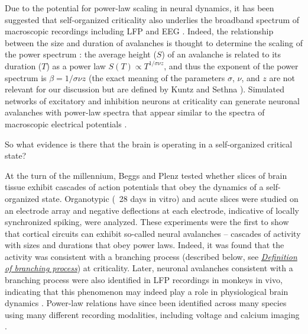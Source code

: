 Due to the potential for power-law scaling in neural dynamics, it has been suggested that self-organized criticality also underlies the broadband spectrum of macroscopic recordings including LFP and EEG \cite{Lombardi2017}. Indeed, the relationship between the size and duration of avalanches is thought to determine the scaling of the power spectrum \cite{Kuntz2000}: the average height ($S$) of an avalanche is related to its duration ($T$) as a power law $S(T)\propto T^{1/\sigma\nu z}$, and thus the exponent of the power spectrum is $\beta=1/\sigma\nu z$ (the exact meaning of the parameters $\sigma$, $\nu$, and $z$ are not relevant for our discussion but are defined by Kuntz and Sethna \cite{Kuntz2000}). Simulated networks of excitatory and inhibition neurons at criticality can generate neuronal avalanches with power-law spectra that appear similar to the spectra of macroscopic electrical potentials \cite{Lombardi2017}.

So what evidence is there that the brain is operating in a self-organized critical state?

At the turn of the millennium, Beggs and Plenz \cite{Beggs2003} tested whether slices of brain tissue exhibit cascades of action potentials that obey the dynamics of a self-organized state. Organotypic (~28 days in vitro) and acute slices were studied on an electrode array and negative deflections at each electrode, indicative of locally synchronized spiking, were analyzed. These experiments were the first to show that cortical circuits can exhibit so-called neural avalanches – cascades of activity with sizes and durations that obey power laws. Indeed, it was found that the activity was consistent with a branching process (described below, see \hyperref[sec:branching_prcoess]{\textit{Definition of branching process}}) at criticality. Later, neuronal avalanches consistent with a branching process were also identified in LFP recordings in monkeys in vivo, indicating that this phenomenon may indeed play a role in physiological brain dynamics \cite{Petermann2009}. Power-law relations have since been identified across many species using many different recording modalities, including voltage \cite{Scott2014} and calcium imaging \cite{Bellay2015,Ponce-Alvarez2018}.

